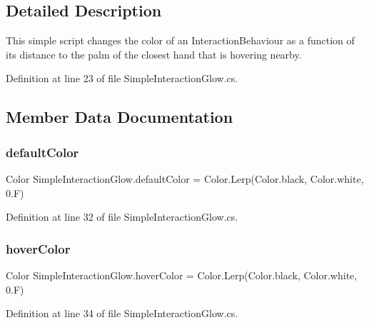 \subsection{Detailed Description}
This simple script changes the color of an Interaction\+Behaviour as a function of its distance to the palm of the closest hand that is hovering nearby. 



Definition at line 23 of file Simple\+Interaction\+Glow.\+cs.



\subsection{Member Data Documentation}
\mbox{\label{class_simple_interaction_glow_a00cd6d0367cc6ad0f3fc84d5de82bdc0}} 
\subsubsection{\texorpdfstring{defaultColor}{defaultColor}}
{\footnotesize\ttfamily Color Simple\+Interaction\+Glow.\+default\+Color = Color.\+Lerp(Color.\+black, Color.\+white, 0.\+F)}



Definition at line 32 of file Simple\+Interaction\+Glow.\+cs.

\mbox{\label{class_simple_interaction_glow_aa12a1f2aa05a0b0a0c421b2c93c17674}} 
\subsubsection{\texorpdfstring{hoverColor}{hoverColor}}
{\footnotesize\ttfamily Color Simple\+Interaction\+Glow.\+hover\+Color = Color.\+Lerp(Color.\+black, Color.\+white, 0.\+F)}



Definition at line 34 of file Simple\+Interaction\+Glow.\+cs.

\mbox{\label{class_simple_interaction_glow_a09bef1794224eada8c49258bb4ab0b04}} 
